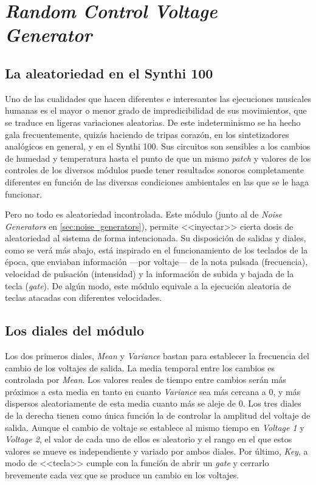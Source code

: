 \section[\textit{Random C. V. Generator}]{\textit{Random Control Voltage Generator}}
\label{sec:random_generator}

\subsection{La aleatoriedad en el Synthi 100}
Uno de las cualidades que hacen diferentes e interesantes las ejecuciones musicales humanas es el mayor o menor grado de impredicibilidad de sus movimientos, que se traduce en ligeras variaciones aleatorias. De este indeterminismo se ha hecho gala frecuentemente, quizás haciendo de tripas corazón, en los sintetizadores analógicos en general, y en el Synthi 100. Sus circuitos son sensibles a los cambios de humedad y temperatura hasta el punto de que un mismo \textit{patch} y valores de los controles de los diversos módulos puede tener resultados sonoros completamente diferentes en función de las diversas condiciones ambientales en las que se le haga funcionar. 

Pero no todo es aleatoriedad incontrolada. Este módulo (junto al de \textit{Noise Generators} en \ref{sec:noise_generators}), permite <<inyectar>> cierta dosis de aleatoriedad al sistema de forma intencionada. Su disposición de salidas y diales, como se verá más abajo, está inspirado en el funcionamiento de los teclados de la época, que enviaban información ---por voltaje--- de la nota pulsada (frecuencia), velocidad de pulsación (intensidad) y la información de subida y bajada de la tecla (\textit{gate}). De algún modo, este módulo equivale a la ejecución aleatoria de teclas atacadas con diferentes velocidades.


\subsection{Los diales del módulo}
Los dos primeros diales, \textit{Mean} y \textit{Variance} bastan para establecer la frecuencia del cambio de los voltajes de salida. La media temporal entre los cambios es controlada por \textit{Mean}. Los valores reales de tiempo entre cambios serán más próximos a esta media en tanto en cuanto \textit{Variance} sea más cercana a 0, y más dispersos aleatoriamente de esta media cuanto más se aleje de 0. Los tres diales de la derecha tienen como única función  la de controlar la amplitud del voltaje de salida. Aunque el cambio de voltaje se establece al mismo tiempo en \textit{Voltage 1} y \textit{Voltage 2}, el valor de cada uno de ellos es aleatorio y el rango en el que estos valores se mueve es independiente y variado por ambos diales. Por último, \textit{Key}, a modo de <<tecla>> cumple con la función de abrir un \textit{gate} y cerrarlo brevemente cada vez que se produce un cambio en los voltajes.

